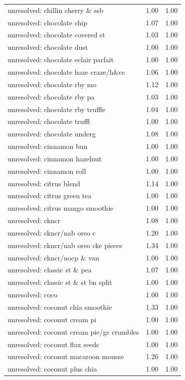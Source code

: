 \begin{table}
\begin{tabular}{lrr}
unresolved: chillin cherry \& ssb & 1.00 & 1.00 \\
unresolved: chocolate chip & 1.07 & 1.00 \\
unresolved: chocolate covered st & 1.03 & 1.00 \\
unresolved: chocolate dust & 1.00 & 1.00 \\
unresolved: chocolate eclair parfait & 1.00 & 1.00 \\
unresolved: chocolate haze craze/h\&cc & 1.06 & 1.00 \\
unresolved: chocolate rby mo & 1.12 & 1.00 \\
unresolved: chocolate rby pa & 1.03 & 1.00 \\
unresolved: chocolate rby truffle & 1.04 & 1.00 \\
unresolved: chocolate truffl & 1.00 & 1.00 \\
unresolved: chocolate underg & 1.08 & 1.00 \\
unresolved: cinnamon bun & 1.00 & 1.00 \\
unresolved: cinnamon hazelnut & 1.00 & 1.00 \\
unresolved: cinnamon roll & 1.00 & 1.00 \\
unresolved: citrus blend & 1.14 & 1.00 \\
unresolved: citrus green tea & 1.00 & 1.00 \\
unresolved: citrus mango smoothie & 1.00 & 1.00 \\
unresolved: ckncr & 1.08 & 1.00 \\
unresolved: ckncr/nab oreo c & 1.20 & 1.00 \\
unresolved: ckncr/nab oreo cke pieces & 1.34 & 1.00 \\
unresolved: ckncr/nocp \& van & 1.00 & 1.00 \\
unresolved: classic st \& pea & 1.07 & 1.00 \\
unresolved: classic st \& st bn split & 1.00 & 1.00 \\
unresolved: coco & 1.00 & 1.00 \\
unresolved: coconut chia smoothie & 1.33 & 1.00 \\
unresolved: coconut cream pi & 1.00 & 1.00 \\
unresolved: coconut cream pie/gc crumbles & 1.00 & 1.00 \\
unresolved: coconut flax seeds & 1.00 & 1.00 \\
unresolved: coconut macaroon mousse & 1.26 & 1.00 \\
unresolved: coconut plus chia & 1.00 & 1.00 \\

\end{tabular}
\end{table}
